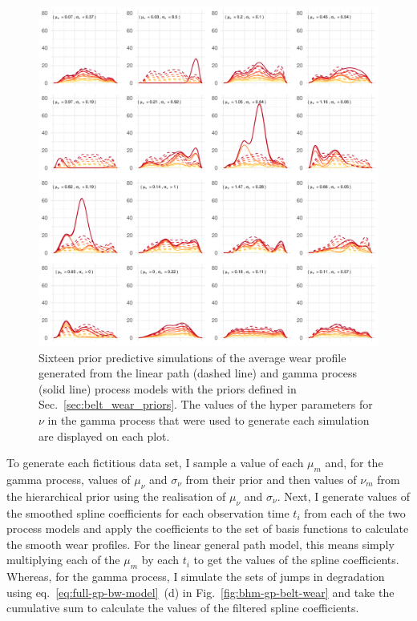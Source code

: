 \begin{figure}
  \centering
  \includegraphics[width=\textwidth]{figures/ch-6/prior-pc.pdf}
  \caption{Sixteen prior predictive simulations of the average wear profile generated from the linear path (dashed line) and gamma process (solid line) process models with the priors defined in Sec.~\ref{sec:belt_wear_priors}. The values of the hyper parameters for $\nu$ in the gamma process that were used to generate each simulation are displayed on each plot.}
  \label{fig:prior-pc-beltwear}
\end{figure}

To generate each fictitious data set, I sample a value of each $\mu_m$ and, for the gamma process, values of $\mu_\nu$ and $\sigma_\nu$ from their prior and then values of $\nu_m$ from the hierarchical prior using the realisation of $\mu_\nu$ and $\sigma_\nu$. Next, I generate values of the smoothed spline coefficients for each observation time $t_i$ from each of the two process models and apply the coefficients to the set of basis functions to calculate the smooth wear profiles. For the linear general path model, this means simply multiplying each of the $\mu_m$ by each $t_i$ to get the values of the spline coefficients. Whereas, for the gamma process, I simulate the sets of jumps in degradation using eq.~\eqref{eq:full-gp-bw-model}~(d) in Fig.~\ref{fig:bhm-gp-belt-wear} and take the cumulative sum to calculate the values of the filtered spline coefficients.

